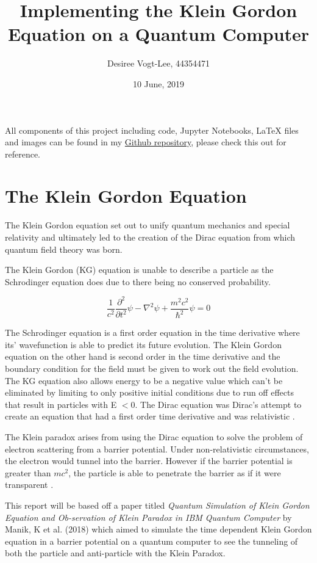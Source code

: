 \documentclass{article}
\title{Implementing the Klein Gordon Equation on a Quantum Computer}
\author{Desiree Vogt-Lee, 44354471}
\date{10 June, 2019}
\begin{document}
	\maketitle
	\begin{center}
	    All components of this project including code, Jupyter Notebooks, LaTeX files and images can be found in my \href{https://github.com/desireevl/PHYS3051}{Github repository}, please check this out for reference.
	\end{center}


\section{The Klein Gordon Equation}
The Klein Gordon equation set out to unify quantum mechanics and special relativity and ultimately led to the creation of the Dirac equation from which quantum field theory was born.

The Klein Gordon (KG) equation is unable to describe a particle as the Schrodinger equation does due to there being no conserved probability. 

\begin{equation}
\frac{1}{c^2}\frac{\partial^2}{\partial t^2}\psi - \nabla^2 \psi + \frac{m^2c^2}{\hbar^2}\psi = 0
\end{equation}

The Schrodinger equation is a first order equation in the time derivative where its' wavefunction is able to predict its future evolution. The Klein Gordon equation on the other hand is second order in the time derivative and the boundary condition for the field must be given to work out the field evolution. The KG equation also allows energy to be a negative value which can't be eliminated by limiting to only positive initial conditions due to run off effects that result in particles with E $< 0$. The Dirac equation was Dirac's attempt to create an equation that had a first order time derivative and was relativistic \cite{uqnotes}.



The Klein paradox arises from using the Dirac equation to solve the problem of electron scattering from a barrier potential. Under non-relativistic circumstances, the electron would tunnel into the barrier. However if the barrier potential is greater than $mc^2$, the particle is able to penetrate the barrier as if it were transparent \cite{klein}.



This report will be based off a paper titled \textit{Quantum Simulation of Klein Gordon Equation and Ob-servation of Klein Paradox in IBM Quantum Computer} by Manik, K et al. (2018) \cite{manik} which aimed to simulate the time dependent Klein Gordon equation in a barrier potential on a quantum computer to see the tunneling of both the particle and anti-particle with the Klein Paradox.
\end{document}
